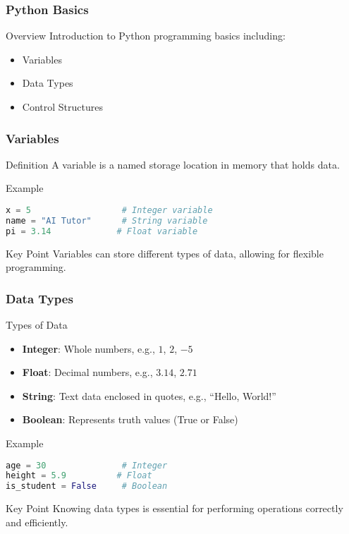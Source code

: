 \documentclass[aspectratio=169]{beamer}
\begin{document}
\begin{frame}[fragile]
    \frametitle{Python Basics}
    \begin{block}{Overview}
        Introduction to Python programming basics including:
        \begin{itemize}
            \item Variables
            \item Data Types
            \item Control Structures
        \end{itemize}
    \end{block}
\end{frame}

\begin{frame}[fragile]
    \frametitle{Variables}
    \begin{block}{Definition}
        A variable is a named storage location in memory that holds data.
    \end{block}
    \begin{block}{Example}
        \begin{lstlisting}[language=python]
x = 5                  # Integer variable
name = "AI Tutor"      # String variable
pi = 3.14             # Float variable
        \end{lstlisting}
    \end{block}
    \begin{block}{Key Point}
        Variables can store different types of data, allowing for flexible programming.
    \end{block}
\end{frame}

\begin{frame}[fragile]
    \frametitle{Data Types}
    \begin{block}{Types of Data}
        \begin{itemize}
            \item \textbf{Integer}: Whole numbers, e.g., $1$, $2$, $-5$
            \item \textbf{Float}: Decimal numbers, e.g., $3.14$, $2.71$
            \item \textbf{String}: Text data enclosed in quotes, e.g., ``Hello, World!''
            \item \textbf{Boolean}: Represents truth values (True or False)
        \end{itemize}
    \end{block}
    \begin{block}{Example}
        \begin{lstlisting}[language=python]
age = 30               # Integer
height = 5.9          # Float
is_student = False     # Boolean
        \end{lstlisting}
    \end{block}
    \begin{block}{Key Point}
        Knowing data types is essential for performing operations correctly and efficiently.
    \end{block}
\end{frame}
\end{document}
